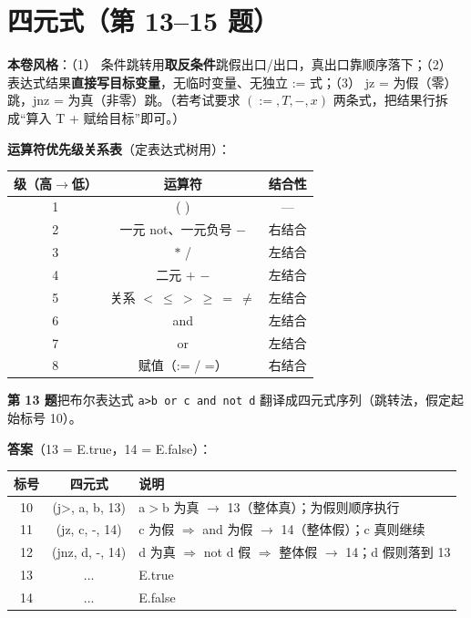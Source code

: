 \documentclass[12pt,a4paper,fontset=windows]{ctexart}
\begin{document}
\section{四元式（第 13--15 题）}

\textbf{本卷风格}：（1） 条件跳转用\textbf{取反条件}跳假出口/出口，真出口靠顺序落下；（2） 表达式结果\textbf{直接写目标变量}，无临时变量、无独立 := 式；（3） jz = 为假（零）跳，jnz = 为真（非零）跳。（若考试要求 $( := , T, -, x )$ 两条式，把结果行拆成``算入 T + 赋给目标''即可。）

\textbf{运算符优先级关系表}（定表达式树用）：

\begin{center}
\renewcommand{\arraystretch}{1.25}
\begin{tabular}{c c c}
\toprule
\textbf{级（高$\to$低）} & \textbf{运算符} & \textbf{结合性} \\
\midrule
1 & ( ) & — \\
2 & 一元 not、一元负号 $-$ & 右结合 \\
3 & $*$ / & 左结合 \\
4 & 二元 $+$ $-$ & 左结合 \\
5 & 关系 $<\ \le\ >\ \ge\ =\ \ne$ & 左结合 \\
6 & and & 左结合 \\
7 & or & 左结合 \\
8 & 赋值（:= / =） & 右结合 \\
\bottomrule
\end{tabular}
\end{center}

\begin{qbox}
{\large\bfseries 第 13 题}\quad 把布尔表达式 \texttt{a>b or c and not d} 翻译成四元式序列（跳转法，假定起始标号 10）。
\end{qbox}

\textbf{答案}（13 = E.true，14 = E.false）：

\begin{center}
\renewcommand{\arraystretch}{1.25}
\begin{tabular}{c c p{8.2cm}}
\toprule
\textbf{标号} & \textbf{四元式} & \textbf{说明} \\
\midrule
10 & (j>, a, b, 13) & a$>$b 为真 $\to$ 13（整体真）；为假则顺序执行 \\
11 & (jz, c, -, 14) & c 为假 $\Rightarrow$ and 为假 $\to$ 14（整体假）；c 真则继续 \\
12 & (jnz, d, -, 14) & d 为真 $\Rightarrow$ not d 假 $\Rightarrow$ 整体假 $\to$ 14；d 假则落到 13 \\
13 & ... & E.true \\
14 & ... & E.false \\
\bottomrule
\end{tabular}
\end{center}
\end{document}
